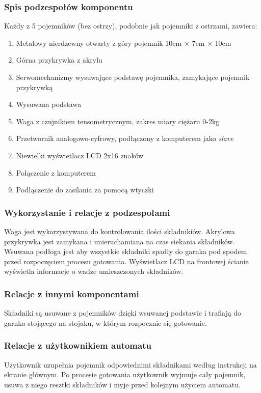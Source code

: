 \documentclass[12pt,a4paper,notitlepage]{article}
\begin{document}
\subsubsection{Spis podzespołów komponentu}
Każdy z 5 pojemników (bez ostrzy), podobnie jak pojemniki z ostrzami, zawiera:
\begin{enumerate}
  \item Metalowy nierdzewny otwarty z góry pojemnik 10cm $\times$ 7cm $\times$ 10cm
  \item Górna przykrywka z akrylu
  \item Serwomechanizmy wysuwające podstawę pojemnika, zamykające pojemnik przykrywką
  \item Wysuwana podstawa
  \item Waga z czujnikiem tensometrycznym, zakres miary ciężaru 0-2kg
  \item Przetwornik analogowo-cyfrowy, podłączony z komputerem jako \emph{slave}
  \item Niewielki wyświetlacz LCD 2x16 znaków
  \item Połączenie z komputerem
  \item Podłączenie do zasilania za pomocą wtyczki
\end{enumerate}
 
\subsubsection{Wykorzystanie i relacje z podzespołami}
Waga jest wykorzystywana do kontrolowania ilości składnikiów. Akrylowa przykrywka jest zamykana i unieruchamiana na czas siekania składników. Wsuwana podłoga jest aby wszystkie składniki spadły do garnka pod spodem przed rozpoczęciem procesu gotowania. Wyświetlacz LCD na frontowej ścianie wyświetla informacje o wadze umieszczonych składników.

\subsubsection{Relacje z innymi komponentami}
Składniki są usuwane z pojemników dzięki wsuwanej podstawie i trafiają do garnka stojącego na stojaku, w którym rozpocznie się gotowanie.

\subsubsection{Relacje z użytkownikiem automatu}
Użytkownik uzupełnia pojemnik odpowiednimi składnikami według instrukcji na ekranie głównym. Po procesie gotowania użytkownik wyjmuje cały pojemnik, usuwa z niego resztki składników i myje przed kolejnym użyciem automatu.
\end{document}
